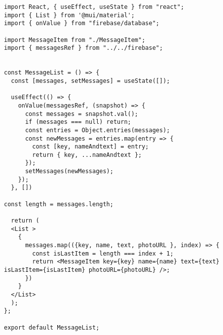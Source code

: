 \begin{verbatim}
import React, { useEffect, useState } from "react";
import { List } from '@mui/material';
import { onValue } from "firebase/database";

import MessageItem from "./MessageItem";
import { messagesRef } from "../../firebase";


const MessageList = () => {
  const [messages, setMessages] = useState([]);

  useEffect(() => {
    onValue(messagesRef, (snapshot) => {
      const messages = snapshot.val();
      if (messages === null) return;
      const entries = Object.entries(messages);
      const newMessages = entries.map(entry => {
        const [key, nameAndtext] = entry;
        return { key, ...nameAndtext };
      });
      setMessages(newMessages);
    });
  }, [])

const length = messages.length;

  return (
  <List >
    {
      messages.map(({key, name, text, photoURL }, index) => {
        const isLastItem = length === index + 1;
        return <MessageItem key={key} name={name} text={text} isLastItem={isLastItem} photoURL={photoURL} />;
      })
    }
  </List>
  );
};

export default MessageList;
\end{verbatim}